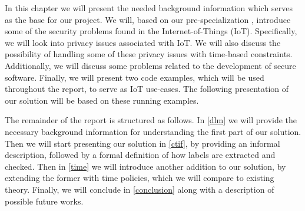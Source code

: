 
In this chapter we will present the needed background information which serves as the base for our project.
We will, based on our pre-specialization \cite{prespecialization}, introduce some of the security problems found in the Internet-of-Things (IoT).
Specifically, we will look into privacy issues associated with IoT.
We will also discuss the possibility of handling some of these privacy issues with time-based constraints.
Additionally, we will discuss some problems related to the development of secure software.
Finally, we will present two code examples, which will be used throughout the report, to serve as IoT use-cases.
The following presentation of our solution will be based on these running examples.

The remainder of the report is structured as follows.
In \cref{dlm} we will provide the necessary background information for understanding the first part of our solution.
Then we will start presenting our solution in \cref{ctif}, by providing an informal description, followed by a formal definition of how labels are extracted and checked.
Then in \cref{time} we will introduce another addition to our solution, by extending the former with time policies, which we will compare to existing theory.
Finally, we will conclude in \cref{conclusion} along with a description of possible future works.
